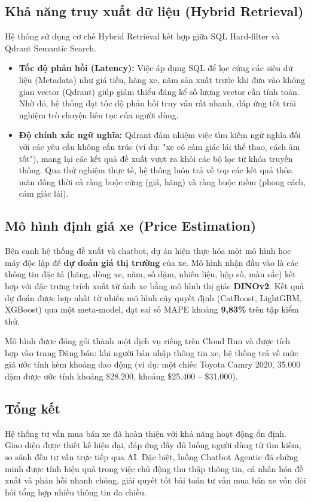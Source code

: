 \subsection{Khả năng truy xuất dữ liệu (Hybrid Retrieval)}
Hệ thống sử dụng cơ chế Hybrid Retrieval kết hợp giữa SQL Hard-filter và Qdrant Semantic Search. 
\begin{itemize}
    \item \textbf{Tốc độ phản hồi (Latency):} Việc áp dụng SQL để lọc cứng các siêu dữ liệu (Metadata) như giá tiền, hãng xe, năm sản xuất trước khi đưa vào không gian vector (Qdrant) giúp giảm thiểu đáng kể số lượng vector cần tính toán. Nhờ đó, hệ thống đạt tốc độ phản hồi truy vấn rất nhanh, đáp ứng tốt trải nghiệm trò chuyện liên tục của người dùng.
    \item \textbf{Độ chính xác ngữ nghĩa:} Qdrant đảm nhiệm việc tìm kiếm ngữ nghĩa đối với các yêu cầu không cấu trúc (ví dụ: "xe có cảm giác lái thể thao, cách âm tốt"), mang lại các kết quả đề xuất vượt ra khỏi các bộ lọc từ khóa truyền thống. Qua thử nghiệm thực tế, hệ thống luôn trả về top các kết quả thỏa mãn đồng thời cả ràng buộc cứng (giá, hãng) và ràng buộc mềm (phong cách, cảm giác lái).
\end{itemize}

\subsection{Mô hình định giá xe (Price Estimation)}
Bên cạnh hệ thống đề xuất và chatbot, dự án hiện thực hóa một mô hình học máy độc lập để \textbf{dự đoán giá thị trường} của xe. Mô hình nhận đầu vào là các thông tin đặc tả (hãng, dòng xe, năm, số dặm, nhiên liệu, hộp số, màu sắc) kết hợp với đặc trưng trích xuất từ ảnh xe bằng mô hình thị giác \textbf{DINOv2}. Kết quả dự đoán được hợp nhất từ nhiều mô hình cây quyết định (CatBoost, LightGBM, XGBoost) qua một meta-model, đạt sai số MAPE khoảng \textbf{9{,}83\%} trên tập kiểm thử.

Mô hình được đóng gói thành một dịch vụ riêng trên Cloud Run và được tích hợp vào trang Đăng bán: khi người bán nhập thông tin xe, hệ thống trả về mức giá ước tính kèm khoảng dao động (ví dụ: một chiếc Toyota Camry 2020, 35.000 dặm được ước tính khoảng \$28.200, khoảng \$25.400 -- \$31.000).

\subsection{Tổng kết}
Hệ thống tư vấn mua bán xe đã hoàn thiện với khả năng hoạt động ổn định. Giao diện được thiết kế hiện đại, đáp ứng đầy đủ luồng người dùng từ tìm kiếm, so sánh đến tư vấn trực tiếp qua AI. Đặc biệt, luồng Chatbot Agentic đã chứng minh được tính hiệu quả trong việc chủ động thu thập thông tin, cá nhân hóa đề xuất và phản hồi nhanh chóng, giải quyết tốt bài toán tư vấn mua bán xe vốn đòi hỏi tổng hợp nhiều thông tin đa chiều.
